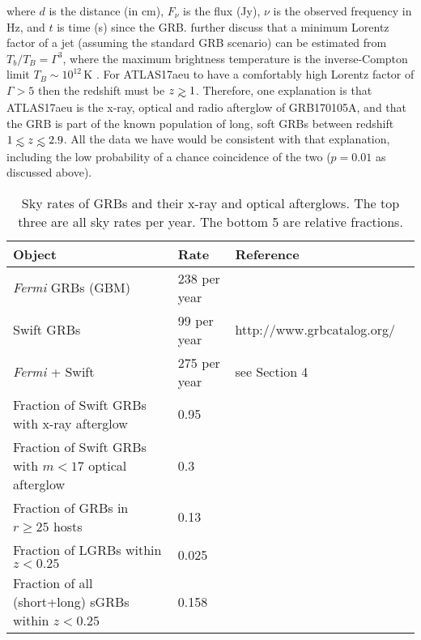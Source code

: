 \documentclass[twocolumn]{aastex61}
\def\lesssim{\mathrel{\hbox{\rlap{\hbox{\lower4pt\hbox{$\sim$}}}\hbox{$<$}}}}
\def\gtrsim{\mathrel{\hbox{\rlap{\hbox{\lower4pt\hbox{$\sim$}}}\hbox{$>$}}}}
\begin{document}
where $d$ is the distance (in cm), $F_\nu$  is the flux (Jy), $\nu$ is the observed frequency in Hz, and $t$ is time (s) 
since the GRB. \cite{2014MNRAS.440.2059A}  further 
discuss that a minimum Lorentz factor of a jet (assuming
the standard GRB scenario) can be estimated 
from $T_{b}/T_{B}=\Gamma^{3}$, where 
the maximum brightness temperature is the inverse-Compton limit
$T_{B} \sim 10^{12}$\,K   \citep[as in][]{1999Natur.398..394G}. 
For ATLAS17aeu to have a comfortably high Lorentz factor of 
$\Gamma>5$ \citep[the minimum found in][]{2014MNRAS.440.2059A}
then the redshift must be $z\gtrsim1$. 
Therefore, one explanation is that ATLAS17aeu is the x-ray, optical and 
radio afterglow of GRB170105A, and that the GRB is part of the 
known population of long, soft GRBs between redshift 
$1 \lesssim z \lesssim 2.9$. All the data we have
would be consistent with that explanation, including the 
low probability of a chance coincidence  of the two ($p=0.01$ as 
discussed above). 

\begin{table*}
\centering
\caption{Sky rates of GRBs and their x-ray and optical afterglows. The top three are all sky rates per year. The bottom 5 are relative fractions. }
\label{tab:rates}
\begin{tabular}{llll}\hline 
Object                  & Rate   & Reference \\\hline 
{\it Fermi} GRBs (GBM) &   238 per year  & \cite{2014ApJS..211...13V}  \\
Swift GRBs         &   99 per year   & http://www.grbcatalog.org/ \\
{\it Fermi} + Swift      &   275 per year  &    see Section 4     \\
Fraction of Swift GRBs with x-ray afterglow   & 0.95    & \cite{2009MNRAS.397.1177E} \\
Fraction of Swift GRBs with $m<17$ optical afterglow   &   0.3 & 
 \cite{2009ApJ...693.1484C} \\
Fraction of GRBs in $r\geq25$ hosts & 0.13 & \cite{2009ApJ...691..182S} \\
Fraction of LGRBs within $z<0.25$ & 0.025 & \cite{2014ARAA..52...43B} \\
Fraction of all (short+long) sGRBs within $z<0.25$ & 0.158 & 
\cite{2014ARAA..52...43B} \\
\hline 
\end{tabular}
\end{table*}
\end{document}
